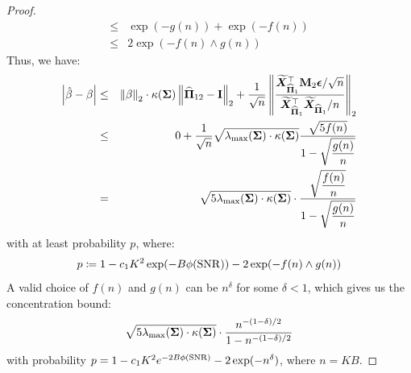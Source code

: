 \documentclass[numsec,webpdf,modern,medium,namedate]{oup-authoring-template}
\theoremstyle{thmstyleone}%
\theoremstyle{thmstyletwo}%
\theoremstyle{thmstylethree}%
\begin{document}
\begin{proof}
{$$\begin{aligned}
        \leq & \exp(-g(n)) + \exp(-f(n)) \\
        \leq & 2\exp(- f(n)\wedge g(n)) 
\end{aligned}
$$}
Thus, we have:
{\footnotesize
\begin{eqnarray*}
 \left|\hat{\beta} - \beta\right| & \leq & \left\lVert \beta \right\rVert_2\cdot \kappa(\boldsymbol{\Sigma})\left\lVert \widehat{\boldsymbol{\Pi}}_{12}- \mathbf{I} \right\rVert_2 + \dfrac{1}{\sqrt{n}}\left\lVert \dfrac{\widetilde{\boldsymbol{X}}_{\widehat{\boldsymbol{\Pi}}_1}^\top \mathbf{M}_2 \boldsymbol{\epsilon}/\sqrt{n}}{\widetilde{\boldsymbol{X}}_{\widehat{\boldsymbol{\Pi}}_1}^\top  \widetilde{\boldsymbol{X}}_{\widehat{\boldsymbol{\Pi}}_1}/n} \right\rVert_2\\
 & \leq & 0 + \dfrac{1}{\sqrt{n}}\sqrt{\lambda_{\max}(\boldsymbol{\Sigma})\cdot\kappa(\boldsymbol{\Sigma})}\dfrac{\sqrt{5f(n)}}{1 - \sqrt{\dfrac{g(n)}{n}}}\\
 & = & \sqrt{5\lambda_{\max}(\boldsymbol{\Sigma})\cdot\kappa(\boldsymbol{\Sigma})}\cdot \dfrac{\sqrt{\dfrac{f(n)}{n}}}{1 - \sqrt{\dfrac{g(n)}{n}}}
\end{eqnarray*}}
with at least probability $p$, where:
\begin{eqnarray*}
    p \coloneq 1 - c_1 K^2 \exp({-B \phi(\mathrm{SNR})}) - 2\exp(- f(n)\wedge g(n)) 
\end{eqnarray*}
A valid choice of $f(n)$ and $g(n)$ can be $n^\delta$ for some $\delta < 1$, which gives us the concentration bound:
\begin{eqnarray*}
    \sqrt{5\lambda_{\max}(\boldsymbol{\Sigma})\cdot\kappa(\boldsymbol{\Sigma})}\cdot \dfrac{n^{-(1 - \delta)/2}}{1 - n^{-(1 - \delta)/2}}
\end{eqnarray*}
with probability $p = 1 - c_1 K^2 e^{-2B \phi(\mathrm{SNR})} - 2\exp(- n^\delta)$, where $n = KB$.
\end{proof}
\end{document}
